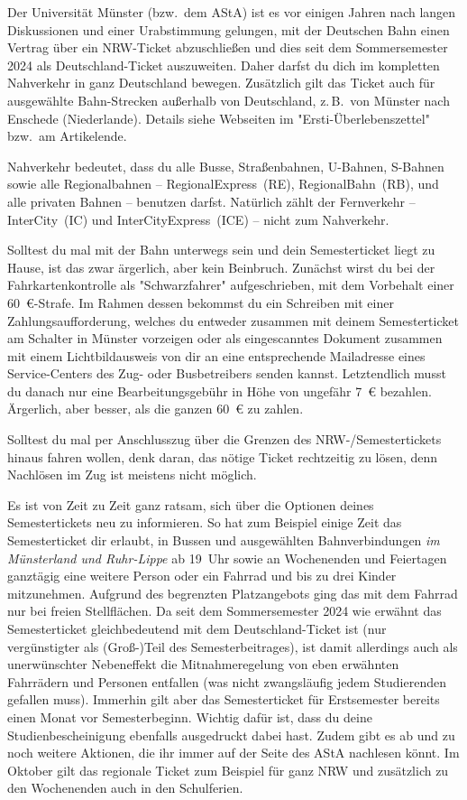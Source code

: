 \begin{multicols*}{2}
Der Universität Münster (bzw.\ dem AStA) ist es vor einigen Jahren nach langen Diskussionen und einer Urabstimmung gelungen, mit der Deutschen Bahn einen Vertrag über ein NRW-Ticket abzuschließen und dies seit dem Sommersemester 2024 als Deutschland-Ticket auszuweiten.
Daher darfst du dich im kompletten Nahverkehr in ganz Deutschland bewegen.
Zusätzlich gilt das Ticket auch für ausgewählte Bahn-Strecken außerhalb von Deutschland, z.\,B.\ von Münster nach Enschede (Niederlande). Details siehe Webseiten im "Ersti-Überlebenszettel" bzw.\ am Artikelende.

Nahverkehr bedeutet, dass du alle Busse, Straßenbahnen, U-Bahnen, S-Bahnen sowie alle Regionalbahnen -- RegionalExpress~(RE), RegionalBahn~(RB), und alle privaten Bahnen -- benutzen darfst.
Natürlich zählt der Fernverkehr -- InterCity~(IC) und InterCityExpress~(ICE) -- nicht zum Nahverkehr.

Solltest du mal mit der Bahn unterwegs sein und dein Semesterticket liegt zu Hause, ist das zwar ärgerlich, aber kein Beinbruch.
Zunächst wirst du bei der Fahrkartenkontrolle als "Schwarzfahrer" aufgeschrieben, mit dem Vorbehalt einer \SI{60}{\euro}-Strafe.
Im Rahmen dessen bekommst du ein Schreiben mit einer Zahlungsaufforderung, welches du entweder zusammen mit deinem Semesterticket am Schalter in Münster vorzeigen oder als eingescanntes Dokument zusammen mit einem Lichtbildausweis von dir an eine entsprechende Mailadresse eines Service-Centers des Zug- oder Busbetreibers senden kannst.  
Letztendlich musst du danach nur eine Bearbeitungsgebühr in Höhe von ungefähr \SI{7}{\euro} bezahlen. Ärgerlich, aber besser, als die ganzen \SI{60}{\euro} zu zahlen.

Solltest du mal per Anschlusszug über die Grenzen des NRW-/Semestertickets hinaus fahren wollen, denk daran, das nötige Ticket rechtzeitig zu lösen, denn Nachlösen im Zug ist meistens nicht möglich.

Es ist von Zeit zu Zeit ganz ratsam, sich über die Optionen deines Semestertickets neu zu informieren.
So hat zum Beispiel einige Zeit das Semesterticket dir erlaubt, in Bussen und ausgewählten Bahnverbindungen \emph{im Münsterland und Ruhr-Lippe} ab 19~Uhr sowie an Wochenenden und Feiertagen ganztägig eine weitere Person oder ein Fahrrad und bis zu drei Kinder mitzunehmen. Aufgrund des begrenzten Platzangebots ging das mit dem Fahrrad nur bei freien Stellflächen.
Da seit dem Sommersemester 2024 wie erwähnt das Semesterticket gleichbedeutend mit dem Deutschland-Ticket ist (nur vergünstigter als (Groß-)Teil des Semesterbeitrages), ist damit allerdings auch als unerwünschter Nebeneffekt die Mitnahmeregelung von eben erwähnten Fahrrädern und Personen entfallen (was nicht zwangsläufig jedem Studierenden gefallen muss). 
Immerhin gilt aber das Semesterticket für Erstsemester bereits einen Monat vor Semesterbeginn. Wichtig dafür ist, dass du deine Studienbescheinigung ebenfalls ausgedruckt dabei hast. Zudem gibt es ab und zu noch weitere Aktionen, die ihr immer auf der Seite des AStA nachlesen könnt. Im Oktober gilt das regionale Ticket zum Beispiel für ganz NRW und zusätzlich zu den Wochenenden auch in den Schulferien.


\end{multicols*}
